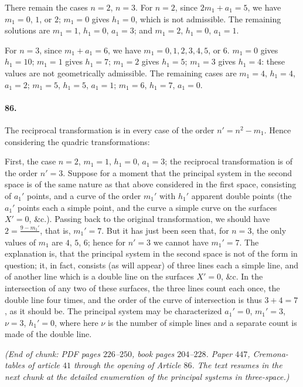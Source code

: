 \documentclass[11pt]{article}
\begin{document}
\medskip

There remain the cases $n=2$, $n=3$. For $n=2$, since $2m_{1}+a_{1}=5$,
we have $m_{1}=0$, $1$, or $2$; $m_{1}=0$ gives $h_{1}=0$, which is not
admissible. The remaining solutions are $m_{1}=1$, $h_{1}=0$,
$a_{1}=3$; and $m_{1}=2$, $h_{1}=0$, $a_{1}=1$.

\medskip

For $n=3$, since $m_{1}+a_{1}=6$, we have $m_{1}=0,1,2,3,4,5$, or $6$.
$m_{1}=0$ gives $h_{1}=10$; $m_{1}=1$ gives $h_{1}=7$; $m_{1}=2$ gives
$h_{1}=5$; $m_{1}=3$ gives $h_{1}=4$: these values are not geometrically
admissible. The remaining cases are $m_{1}=4$, $h_{1}=4$, $a_{1}=2$;
$m_{1}=5$, $h_{1}=5$, $a_{1}=1$; $m_{1}=6$, $h_{1}=7$, $a_{1}=0$.

\medskip

\paragraph{86.}
The reciprocal transformation is in every case of the order
$n'=n^{2}-m_{1}$. Hence considering the quadric transformations:

\medskip

First, the case $n=2$, $m_{1}=1$, $h_{1}=0$, $a_{1}=3$; the reciprocal
transformation is of the order $n'=3$. Suppose for a moment that the
principal system in the second space is of the same nature as that
above considered in the first space, consisting of $a_{1}'$ points,
and a curve of the order $m_{1}'$ with $h_{1}'$ apparent double points
(the $a_{1}'$ points each a simple point, and the curve a simple curve
on the surfaces $X'=0$, \&c.). Passing back to the original
transformation, we should have $2=\tfrac{9-m_{1}'}{}$, that is,
$m_{1}'=7$. But it has just been seen that, for $n=3$, the only values
of $m_{1}$ are $4$, $5$, $6$; hence for $n'=3$ we cannot have
$m_{1}'=7$. The explanation is, that the principal system in the
second space is not of the form in question; it, in fact, consists
(as will appear) of three lines each a simple line, and of another
line which is a double line on the surfaces $X'=0$, \&c. In the
intersection of any two of these surfaces, the three lines count each
once, the double line four times, and the order of the curve of
intersection is thus $3+4=7$, as it should be. The principal system
may be characterized $a_{1}'=0$, $m_{1}'=3$, $\nu=3$, $h_{1}'=0$,
where here $\nu$ is the number of simple lines and a separate count is
made of the double line.

\bigskip

\noindent\textit{(End of chunk: PDF pages $226$--$250$, book pages
$204$--$228$. Paper $447$, Cremona-tables of article $41$ through the
opening of Article $86$. The text resumes in the next chunk at the
detailed enumeration of the principal systems in three-space.)}
\end{document}
